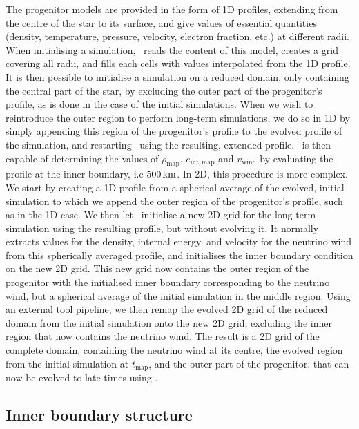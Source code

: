 The progenitor models are provided in the form of 1D profiles, extending from the centre of the star to its surface, and give values of essential quantities (density, temperature, pressure, velocity, electron fraction, etc.) at different radii. When initialising a simulation, \flash\ reads the content of this model, creates a grid covering all radii, and fills each cells with values interpolated from the 1D profile. It is then possible to initialise a simulation on a reduced domain, only containing the central part of the star, by excluding the outer part of the progenitor's profile, as is done in the case of the initial simulations. When we wish to reintroduce the outer region to perform long-term simulations, we do so in 1D by simply appending this region of the progenitor's profile to the evolved profile of the simulation, and restarting \flash\ using the resulting, extended profile. \flash\ is then capable of determining the values of \(\rho_\mathrm{map}\), \(e_\mathrm{int,map}\) and \(v_\mathrm{wind}\) by evaluating the profile at the inner boundary, i.e \(500\,\mathrm{km}\). In 2D, this procedure is more complex. We start by creating a 1D profile from a spherical average of the evolved, initial simulation to which we append the outer region of the progenitor's profile, such as in the 1D case. We then let \flash\ initialise a new 2D grid for the long-term simulation using the resulting profile, but without evolving it. It normally extracts values for the density, internal energy, and velocity for the neutrino wind from this spherically averaged profile, and initialises the inner boundary condition on the new 2D grid. This new grid now contains the outer region of the progenitor with the initialised inner boundary corresponding to the neutrino wind, but a spherical average of the initial simulation in the middle region. Using an external tool pipeline, we then remap the evolved 2D grid of the reduced domain from the initial simulation onto the new 2D grid, excluding the inner region that now contains the neutrino wind. The result is a 2D grid of the complete domain, containing the neutrino wind at its centre, the evolved region from the initial simulation at \(t_\mathrm{map}\), and the outer part of the progenitor, that can now be evolved to late times using \flash.

\subsection{Inner boundary structure} \label{sec:bdry_structure}

